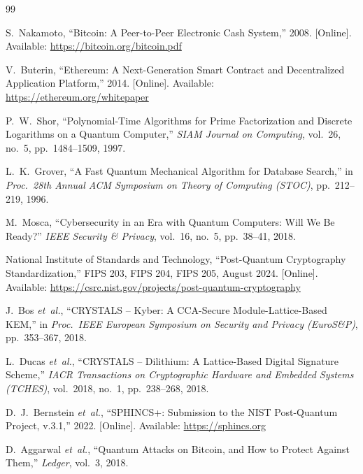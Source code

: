 \documentclass[12pt, a4paper, twocolumn]{article}
\begin{document}
\begin{thebibliography}{99}

S.~Nakamoto, ``Bitcoin: A Peer-to-Peer Electronic Cash System,'' 2008. [Online]. Available: \url{https://bitcoin.org/bitcoin.pdf}

V.~Buterin, ``Ethereum: A Next-Generation Smart Contract and Decentralized Application Platform,'' 2014. [Online]. Available: \url{https://ethereum.org/whitepaper}

P.~W.~Shor, ``Polynomial-Time Algorithms for Prime Factorization and Discrete Logarithms on a Quantum Computer,'' \textit{SIAM Journal on Computing}, vol.~26, no.~5, pp.~1484--1509, 1997.

L.~K.~Grover, ``A Fast Quantum Mechanical Algorithm for Database Search,'' in \textit{Proc.\ 28th Annual ACM Symposium on Theory of Computing (STOC)}, pp.~212--219, 1996.

M.~Mosca, ``Cybersecurity in an Era with Quantum Computers: Will We Be Ready?'' \textit{IEEE Security \& Privacy}, vol.~16, no.~5, pp.~38--41, 2018.

National Institute of Standards and Technology, ``Post-Quantum Cryptography Standardization,'' FIPS 203, FIPS 204, FIPS 205, August 2024. [Online]. Available: \url{https://csrc.nist.gov/projects/post-quantum-cryptography}

J.~Bos \textit{et~al.}, ``CRYSTALS -- Kyber: A CCA-Secure Module-Lattice-Based KEM,'' in \textit{Proc.\ IEEE European Symposium on Security and Privacy (EuroS\&P)}, pp.~353--367, 2018.

L.~Ducas \textit{et~al.}, ``CRYSTALS -- Dilithium: A Lattice-Based Digital Signature Scheme,'' \textit{IACR Transactions on Cryptographic Hardware and Embedded Systems (TCHES)}, vol.~2018, no.~1, pp.~238--268, 2018.

D.~J.~Bernstein \textit{et~al.}, ``SPHINCS+: Submission to the NIST Post-Quantum Project, v.3.1,'' 2022. [Online]. Available: \url{https://sphincs.org}

D.~Aggarwal \textit{et~al.}, ``Quantum Attacks on Bitcoin, and How to Protect Against Them,'' \textit{Ledger}, vol.~3, 2018.


\end{thebibliography}
\end{document}
